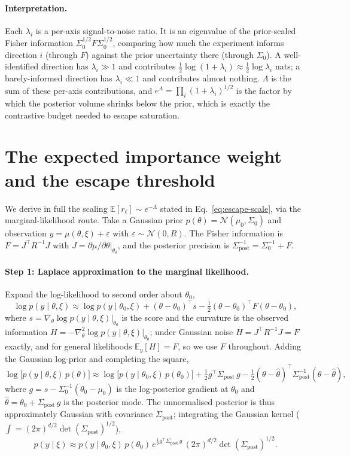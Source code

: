 \paragraph{Interpretation.} Each $\lambda_i$ is a per-axis signal-to-noise ratio. It is
an eigenvalue of the prior-scaled Fisher information $\Sigma_0^{1/2}F\Sigma_0^{1/2}$,
comparing how much the experiment informs direction $i$ (through $F$) against the prior
uncertainty there (through $\Sigma_0$). A well-identified direction has $\lambda_i\gg1$
and contributes $\tfrac12\log(1+\lambda_i)\approx\tfrac12\log\lambda_i$ nats; a
barely-informed direction has $\lambda_i\ll1$ and contributes almost nothing. $\Lambda$
is the sum of these per-axis contributions, and $e^{\Lambda}=\prod_i(1+\lambda_i)^{1/2}$
is the factor by which the posterior volume shrinks below the prior, which is exactly
the contrastive budget needed to escape saturation.

\section{The expected importance weight and the escape threshold}
We derive in full the scaling $\mathbb{E}[r_\ell]\sim e^{-\Lambda}$ stated in
Eq.~\eqref{eq:escape-scale}, via the marginal-likelihood route. Take a Gaussian prior
$p(\theta)=\mathcal N(\mu_0,\Sigma_0)$ and observation $y=\mu(\theta,\xi)+\varepsilon$
with $\varepsilon\sim\mathcal N(0,R)$. The Fisher information is $F=J^\top R^{-1}J$
with $J=\partial\mu/\partial\theta|_{\theta_0}$, and the posterior precision is
$\Sigma_{\mathrm{post}}^{-1}=\Sigma_0^{-1}+F$.

\paragraph{Step 1: Laplace approximation to the marginal likelihood.}
Expand the log-likelihood to second order about $\theta_0$,
\[
\log p(y\mid\theta,\xi) \approx \log p(y\mid\theta_0,\xi) + (\theta-\theta_0)^\top s - \tfrac12(\theta-\theta_0)^\top F(\theta-\theta_0),
\]
where $s=\nabla_\theta\log p(y\mid\theta,\xi)|_{\theta_0}$ is the score and the
curvature is the observed information $H=-\nabla_\theta^2\log p(y\mid\theta,\xi)|_{\theta_0}$;
under Gaussian noise $H=J^\top R^{-1}J=F$ exactly, and for general likelihoods
$\mathbb{E}_y[H]=F$, so we use $F$ throughout. Adding the Gaussian log-prior and
completing the square,
\[
\log\bigl[p(y\mid\theta,\xi)\,p(\theta)\bigr] \approx \log\bigl[p(y\mid\theta_0,\xi)\,p(\theta_0)\bigr] + \tfrac12 g^\top\Sigma_{\mathrm{post}}\,g - \tfrac12(\theta-\hat\theta)^\top\Sigma_{\mathrm{post}}^{-1}(\theta-\hat\theta),
\]
where $g=s-\Sigma_0^{-1}(\theta_0-\mu_0)$ is the log-posterior gradient at $\theta_0$
and $\hat\theta=\theta_0+\Sigma_{\mathrm{post}}\,g$ is the posterior mode. The
unnormalised posterior is thus approximately Gaussian with covariance
$\Sigma_{\mathrm{post}}$; integrating the Gaussian kernel
($\int = (2\pi)^{d/2}\det(\Sigma_{\mathrm{post}})^{1/2}$),
\[
p(y\mid\xi) \approx p(y\mid\theta_0,\xi)\,p(\theta_0)\,e^{\frac12 g^\top\Sigma_{\mathrm{post}}\,g}\,(2\pi)^{d/2}\det(\Sigma_{\mathrm{post}})^{1/2}.
\]

